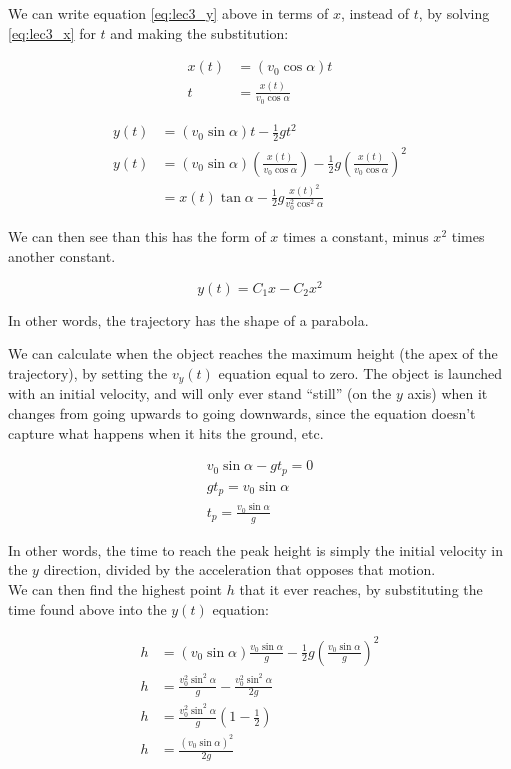 \documentclass[8.01x]{subfiles}
\begin{document}
We can write equation \eqref{eq:lec3_y} above in terms of $x$, instead of $t$, by solving \eqref{eq:lec3_x} for $t$ and making the substitution:

\begin{align}
x(t) &= (v_0 \cos \alpha) t\\
t &= \frac{x(t)}{v_0 \cos \alpha}
\end{align}

\begin{align}
y(t) &= (v_0 \sin \alpha) t - \frac{1}{2} g t^2\\
y(t) &= (v_0 \sin \alpha) \left(\frac{x(t)}{v_0 \cos \alpha}\right) - \frac{1}{2} g \left(\frac{x(t)}{v_0 \cos \alpha}\right)^2\\
     &= x(t) \tan \alpha - \frac{1}{2} g \frac{x(t)^2}{v_0^2 \cos^2 \alpha}
\end{align}

We can then see than this has the form of $x$ times a constant, minus $x^2$ times another constant.

\begin{equation}
y(t) = C_1 x - C_2 x^2
\end{equation}

In other words, the trajectory has the shape of a parabola.

We can calculate when the object reaches the maximum height (the apex of the trajectory), by setting the $v_y(t)$ equation equal to zero. The object is launched with an initial velocity, and will only ever stand ``still'' (on the $y$ axis) when it changes from going upwards to going downwards, since the equation doesn't capture what happens when it hits the ground, etc.

\begin{align}
v_0 \sin \alpha - g t_p = 0\\
g t_p = v_0 \sin \alpha\\
t_p = \frac{v_0 \sin \alpha}{g}
\end{align}

In other words, the time to reach the peak height is simply the initial velocity in the $y$ direction, divided by the acceleration that opposes that motion.\\
We can then find the highest point $h$ that it ever reaches, by substituting the time found above into the $y(t)$ equation:

\begin{align}
h &= (v_0 \sin \alpha) \frac{v_0 \sin \alpha}{g} - \frac{1}{2} g \left(\frac{v_0 \sin \alpha}{g}\right)^2\\
h &= \frac{v_0^2 \sin^2 \alpha}{g} - \frac{v_0^2 \sin^2 \alpha}{2g}\\
h &= \frac{v_0^2 \sin^2 \alpha}{g} \left(1 - \frac{1}{2}\right)\\
h &= \frac{(v_0 \sin \alpha)^2}{2g}
\end{align}
\end{document}
